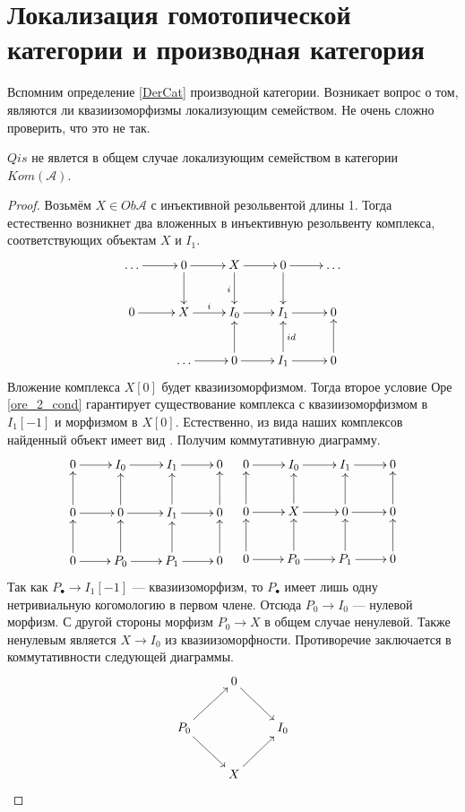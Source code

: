 \documentclass[../main.tex]{subfiles}
\begin{document}
\section{Локализация гомотопической категории и производная категория}
Вспомним определение \ref{DerCat} производной категории. 
Возникает вопрос о том, являются ли квазиизоморфизмы локализующим семейством. 
Не очень сложно проверить, что это не так.
\begin{to_suj}\label{Kom_Qis_counterex}
$Qis$ не явлется в общем случае локализующим семейством в категории $Kom(\mathcal{A})$.
\end{to_suj}
\begin{proof}
Возьмём $X\in Ob\mathcal{A}$ с инъективной резольвентой длины 1. 
Тогда естественно возникнет два вложенных в инъективную резольвенту комплекса, соответствующих объектам $X$ и $I_1$.
\begin{equation*}
\xymatrix{
\ldots\ar[r]&0\ar[r]\ar[d]&X\ar[r]\ar[d]_i&0\ar[d]\ar[r]&\ldots\\
0\ar[r]&X\ar[r]^i&I_0\ar[r]&I_1\ar[r]&0\\
&\ldots\ar[r]&0\ar[r]\ar[u]&I_1\ar[u]_{id}\ar[r]&0\ar[u]
}
\end{equation*}
Вложение комплекса $X[0]$ будет квазиизоморфизмом. 
Тогда второе условие Оре \eqref{ore_2_cond} гарантирует существование комплекса с квазиизоморфизмом в $I_1[-1]$ и морфизмом в $X[0]$. 
Естественно, из вида наших комплексов найденный объект имеет вид . Получим коммутативную диаграмму.
\begin{equation*}
    \xymatrix{0\ar[r]&I_0\ar[r]&I_1\ar[r]&0\\
    0\ar[u]\ar[r]&0\ar[u]\ar[r]&I_1\ar[r]\ar[u]&0\ar[u]\\
    0\ar[u]\ar[r]&P_0\ar[r]\ar[u]&P_1\ar[r]\ar[u]&0\ar[u]}\quad
    \xymatrix{0\ar[r]&I_0\ar[r]&I_1\ar[r]&0\\
    0\ar[u]\ar[r]&X\ar[u]\ar[r]&0\ar[r]\ar[u]&0\ar[u]\\
    0\ar[u]\ar[r]&P_0\ar[r]\ar[u]&P_1\ar[r]\ar[u]&0\ar[u]}
\end{equation*}
Так как $P_\bullet\to I_1[-1]$ --- квазиизоморфизм, то $P_\bullet$ имеет лишь одну нетривиальную когомологию в первом члене. Отсюда $P_0\to I_0$ --- нулевой морфизм.
С другой стороны морфизм $P_0\to X$ в общем случае ненулевой. Также ненулевым является $X\to I_0$ из квазиизоморфности. Противоречие заключается в коммутативности следующей диаграммы.
\begin{equation*}
    \xymatrix{&0\ar[rd]\\
    P_0\ar[ru]\ar[rd]&&I_0\\
    &X\ar[ru]}
\end{equation*}
\end{proof}
\end{document}
